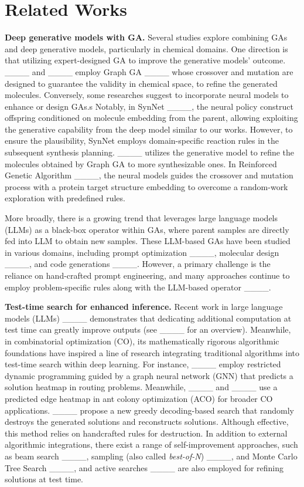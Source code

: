 \section{Related Works}
\label{sec:related}


\textbf{Deep generative models with GA.} Several studies explore combining GAs and deep generative models, particularly in chemical domains. One direction is that utilizing expert-designed GA to improve the generative models' outcome. ____ and ____ employ Graph GA ____ whose crossover and mutation are designed to guarantee the validity in chemical space, to refine the generated molecules. 
Conversely, some researches suggest to incorporate neural models to enhance or design GAs.s
Notably, in SynNet ____, the neural policy construct offspring conditioned on molecule embedding from the parent, allowing exploiting the generative capability from the deep model similar to our works. However, to ensure the plausibility, SynNet employs domain-specific reaction rules in the subsequent synthesis planning. 
____ utilizes the generative model to refine the molecules obtained by Graph GA to more synthesizable ones. In Reinforced Genetic Algorithm ____, the neural models guides the crossover and mutation process with a protein target structure embedding to overcome a random-work exploration with predefined rules.

More broadly, there is a growing trend that leverages large language models (LLMs) as a black-box operator within GAs, where parent samples are directly fed into LLM to obtain new samples. These LLM-based GAs have been studied in various domains, including prompt optimization ____, molecular design ____, and code generations ____. However, a primary challenge is the reliance on hand-crafted prompt engineering, and many approaches continue to employ problem-specific rules along with the LLM-based operator ____.



\textbf{Test-time search for enhanced inference. } Recent work in large language models (LLMs) ____ demonstrates that dedicating additional computation at test time can greatly improve outputs (see ____ for an overview).
Meanwhile, in combinatorial optimization (CO), its mathematically rigorous algorithmic foundations have inspired a line of research integrating traditional algorithms into test-time search within deep learning. For instance, ____ employ restricted dynamic programming guided by a graph neural network (GNN) that predicts a solution heatmap in routing problems. Meanwhile, ____ and ____ use a predicted edge heatmap in ant colony optimization (ACO) for broader CO applications. ____ propose a new greedy decoding-based search that randomly destroys the generated solutions and reconstructs solutions. Although effective, this method relies on handcrafted rules for destruction.
In addition to external algorithmic integrations, there exist a range of self-improvement approaches, such as beam search ____, sampling (also called \textit{best-of-N}) ____, and Monte Carlo Tree Search ____, and active searches ____ are also employed for refining solutions at test time.

